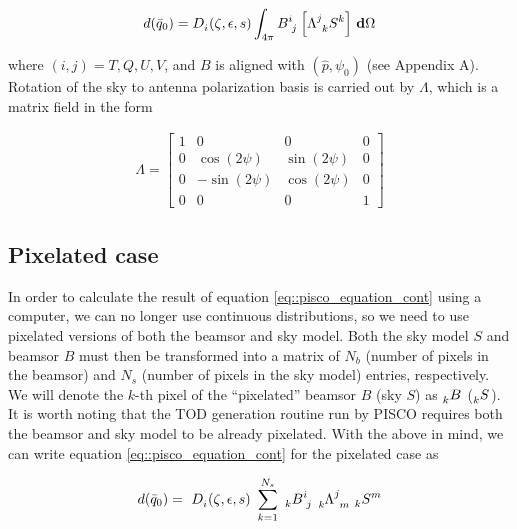 \documentclass[a4paper,11pt]{article}
\begin{document}
\begin{equation}
\begin{aligned}
d(\bar{q}_0) = \tensor{D}{_{i}}(\zeta,\epsilon,s) \int_{4\pi} \tensor{B}{^{i}_{j} } \left[ \tensor{\Lambda}{^{j}_{k} } \tensor{S}{^{k}} \right ] \, \mathbf{d} \Omega
\end{aligned}
\label{eq::pisco_equation_cont}
\end{equation}

\noindent
where $(i,j) = T,Q,U,V$, and $B$ is aligned with $(\hat{p},\psi_0)$ (see Appendix A). Rotation of the sky to antenna polarization basis is carried out by $\Lambda$, which is a matrix field in the form

\begin{equation}
\begin{aligned}
\Lambda =
\begin{bmatrix}
1  & 0 & 0 & 0\\
0  & \cos(2\psi) & \sin(2\psi) & 0\\
0  &-\sin(2\psi) & \cos(2\psi) & 0\\
0  & 0 & 0 & 1
\end{bmatrix}
\end{aligned}
\label{eq::lambda_operator}
\end{equation}

\subsection{Pixelated case}
\label{sec::pixel_conv}

In order to calculate the result of equation \ref{eq::pisco_equation_cont} using a computer, we can no longer use continuous distributions, so we need to use pixelated versions of both the beamsor and sky model. Both the sky model $S$ and beamsor $B$ must then be transformed into a matrix of $N_b$ (number of pixels in the beamsor) and $N_s$ (number of pixels in the sky model) entries, respectively. We will denote the $k$-th pixel of the ``pixelated'' beamsor $B$ (sky $S$) as $\tensor[_k]{B}{}$ ($\tensor[_k]{S}{}$). It is worth noting that the TOD generation routine run by PISCO requires both the beamsor and sky model to be already pixelated. With the above in mind, we can write equation \ref{eq::pisco_equation_cont} for the pixelated case as

\begin{equation}
\begin{aligned}
d(\bar{q}_0) = \
\tensor{D}{_{i}}(\zeta,\epsilon,s) \
\sum_{k=1}^{N_s} \
\tensor[_k]{B}{^i_j} \
\tensor[_k]{\Lambda}{^j_m} \
\tensor[_k]{S}{^m}
\end{aligned}
\label{eq::discrete_beam_conv_tensor}
\end{equation}
\end{document}
